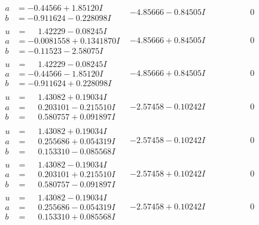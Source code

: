 \documentclass[1p]{elsarticle_modified}
\theoremstyle{definition}
\begin{document}
$$\begin{array}{c|c|c}
\begin{aligned}
a &= -0.44566 + 1.85120 I \\
b &= -0.911624 - 0.228098 I\end{aligned}
 & -4.85666 - 0.84505 I & \phantom{-0.000000 } 0 \\ \hline\begin{aligned}
u &= \phantom{-}1.42229 - 0.08245 I \\
a &= -0.0081558 + 0.1341870 I \\
b &= -0.11523 - 2.58075 I\end{aligned}
 & -4.85666 + 0.84505 I & \phantom{-0.000000 } 0 \\ \hline\begin{aligned}
u &= \phantom{-}1.42229 - 0.08245 I \\
a &= -0.44566 - 1.85120 I \\
b &= -0.911624 + 0.228098 I\end{aligned}
 & -4.85666 + 0.84505 I & \phantom{-0.000000 } 0 \\ \hline\begin{aligned}
u &= \phantom{-}1.43082 + 0.19034 I \\
a &= \phantom{-}0.203101 - 0.215510 I \\
b &= \phantom{-}0.580757 + 0.091897 I\end{aligned}
 & -2.57458 - 0.10242 I & \phantom{-0.000000 } 0 \\ \hline\begin{aligned}
u &= \phantom{-}1.43082 + 0.19034 I \\
a &= \phantom{-}0.255686 + 0.054319 I \\
b &= \phantom{-}0.153310 - 0.085568 I\end{aligned}
 & -2.57458 - 0.10242 I & \phantom{-0.000000 } 0 \\ \hline\begin{aligned}
u &= \phantom{-}1.43082 - 0.19034 I \\
a &= \phantom{-}0.203101 + 0.215510 I \\
b &= \phantom{-}0.580757 - 0.091897 I\end{aligned}
 & -2.57458 + 0.10242 I & \phantom{-0.000000 } 0 \\ \hline\begin{aligned}
u &= \phantom{-}1.43082 - 0.19034 I \\
a &= \phantom{-}0.255686 - 0.054319 I \\
b &= \phantom{-}0.153310 + 0.085568 I\end{aligned}
 & -2.57458 + 0.10242 I & \phantom{-0.000000 } 0\\

\end{array}$$
\end{document}

